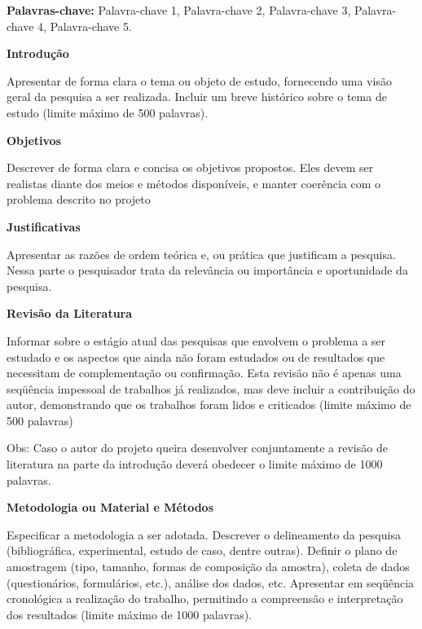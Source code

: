 \documentclass[a4paper]{article}
\begin{document}
\vfill

\textbf{Palavras-chave:} Palavra-chave 1, Palavra-chave 2, Palavra-chave 3, Palavra-chave 4, Palavra-chave 5.

\vfill

\textbf{Introdução}

Apresentar de forma clara o tema ou objeto de estudo\cite{gil2010}, fornecendo uma visão geral da pesquisa a ser realizada. Incluir um breve histórico sobre o tema de estudo (limite máximo de 500 palavras).

\vfill

\textbf{Objetivos}

Descrever de forma clara e concisa os objetivos propostos.  Eles devem ser realistas diante dos meios e métodos disponíveis, e manter coerência com o problema descrito no projeto

\vfill

\textbf{Justificativas}

Apresentar as razões de ordem teórica e, ou prática que justificam a pesquisa. Nessa parte o pesquisador trata da relevância ou importância e oportunidade da pesquisa.

\vfill

\textbf{Revisão da Literatura}

Informar sobre o estágio atual das pesquisas que envolvem o problema a ser estudado e os aspectos que ainda não foram estudados ou de resultados que necessitam de complementação ou confirmação. Esta revisão não é apenas uma seqüência impessoal de trabalhos já realizados, mas deve incluir a contribuição do autor, demonstrando que os trabalhos foram lidos e criticados (limite máximo de 500 palavras)

Obs: Caso o autor do projeto queira desenvolver conjuntamente a revisão de literatura na parte da introdução deverá obedecer o limite máximo de 1000 palavras.

\vfill

\textbf{Metodologia ou Material e Métodos}

Especificar a metodologia a ser adotada. Descrever o delineamento da pesquisa (bibliográfica, experimental, estudo de caso, dentre outras). Definir o plano de amostragem (tipo, tamanho, formas de composição da amostra), coleta de dados (questionários, formulários, etc.), análise dos dados, etc. Apresentar em seqüência cronológica a realização do trabalho, permitindo a compreensão e interpretação dos resultados (limite máximo de 1000 palavras). 

\vfill
\end{document}
